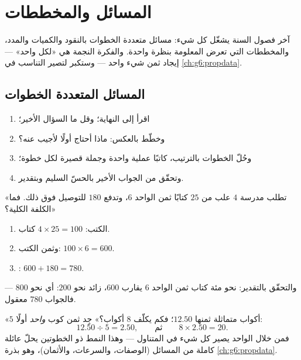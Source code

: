 \chapter{المسائل والمخططات}\label{ch:g5:data}

آخر فصول السنة يشغّل كل شيء: مسائل متعددة الخطوات
بالنقود والكميات والمدد، والمخططات التي تعرض المعلومة
بنظرة واحدة. والفكرة النجمة هي «لكل واحد» --- إيجاد ثمن
شيء واحد --- وستكبر لتصير التناسب في \cref{ch:g6:propdata}.

\section{المسائل المتعددة الخطوات}

\begin{method}\label{met:g5:data:steps}
\begin{enumerate}
  \item اقرأ إلى النهاية؛ وقل ما السؤال الأخير؛
  \item وخطّط بالعكس: ماذا أحتاج أولًا لأجيب عنه؟
  \item وحُلّ الخطوات بالترتيب، كاتبًا عملية واحدة وجملة
        قصيرة لكل خطوة؛
  \item وتحقّق من الجواب الأخير بالحسّ السليم وبتقدير.
\end{enumerate}
\end{method}

\begin{example}\label{ex:g5:data:multistep}
«تطلب مدرسة $4$ علب من $25$ كتابًا ثمن الواحد $6$، وتدفع
$180$ للتوصيل فوق ذلك. فما الكلفة الكلية؟»
\begin{enumerate}
  \item الكتب: $4 \times 25 = 100$ كتاب.
  \item وثمن الكتب: $100 \times 6 = 600$.
  \item {}: $600 + 180 = 780$.
\end{enumerate}
والتحقّق بالتقدير: نحو مئة كتاب ثمن الواحد $6$ يقارب $600$، زائد
نحو $200$: أي نحو $800$ --- فالجواب $780$ معقول.
\end{example}

\begin{example}\label{ex:g5:data:perone}
«$5$ أكواب متماثلة ثمنها $12.50$؛ فكم يكلّف $8$ أكواب؟»
جِد ثمن كوب \emph{واحد} أولًا:
\[
12.50 \div 5 = 2.50,
\qquad\text{ثم}\qquad
8 \times 2.50 = 20 .
\]
فمن خلال الواحد يصير كل شيء في المتناول --- وهذا النمط ذو
الخطوتين يحلّ عائلة كاملة من المسائل (الوصفات، والسرعات،
والأثمان)، وهو بذرة \cref{ch:g6:propdata}.
\end{example}

